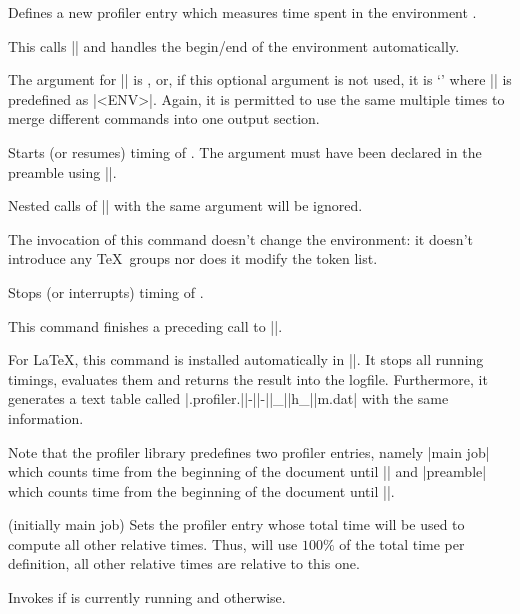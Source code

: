 \begin{command}{\pgfprofilenewforenvironment{}}
	Defines a new profiler entry which measures time spent in the environment .

	This calls |\pgfprofilenew| and handles the begin/end of the environment automatically.

	The argument for |\pgfprofilenew| is , or, if this optional argument is not used, it is `\declareandlabel{\pgfprofileenv}' where |\pgfprofileenv| is predefined as |<ENV>|. Again, it is permitted to use the same  multiple times to merge different commands into one output section.

\end{command}


\begin{command}{\pgfprofilestart{}}
	Starts (or resumes) timing of . The argument must have been declared in the preamble using |\pgfprofilenew|.

	Nested calls of |\pgfprofilestart| with the same argument will be ignored.

	The invocation of this command doesn't change the environment: it doesn't introduce any \TeX\ groups nor does it modify the token list.
\end{command}

\begin{command}{\pgfprofileend{}}
	Stops (or interrupts) timing of .

	This command finishes a preceding call to |\pgfprofilestart|.
\end{command}

\begin{command}{\pgfprofilepostprocess}
	For \LaTeX, this command is installed automatically in ||. It stops all running timings, evaluates them and returns the result into the logfile. Furthermore, it generates a text table called |\jobname.profiler.||-||-||_||h_||m.dat| with the same information.

	Note that the profiler library predefines two profiler entries, namely |main job| which counts time from the beginning of the document until |\pgfprofilepostprocess| and |preamble| which counts time from the beginning of the document until ||.
\end{command}

\begin{command}{\pgfprofilesetrel{} (initially main job)}
	Sets the profiler entry whose total time will be used to compute all other relative times. Thus,  will use $100\%$ of the total time per definition, all other relative times are relative to this one.
\end{command}

\begin{command}{\pgfprofileifisrunning{}}
	Invokes  if  is currently running and  otherwise.
\end{command}
